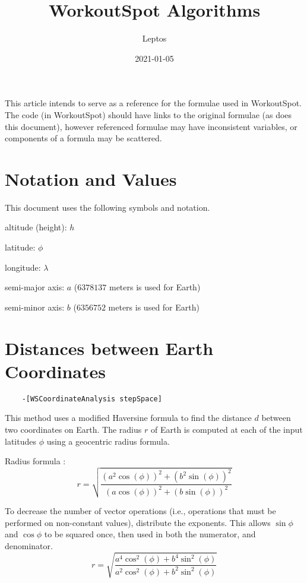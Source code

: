 \documentclass{article}
\title{WorkoutSpot Algorithms}
\author{Leptos}
\date{2021-01-05}
\begin{document}
\maketitle

This article intends to serve as a reference for the formulae used in 
WorkoutSpot. The code (in WorkoutSpot) should have links to the original
formulae (as does this document), however referenced formulae may have 
inconsistent variables, or components of a formula may be scattered.

\section{Notation and Values}

This document uses the following symbols and notation.

altitude (height): $h$

latitude: $\phi$

longitude: $\lambda$

semi-major axis: $a$ ($6378137$ meters is used for Earth)
\cite[Fixed radius]{wikipedia_Earth_radius}

semi-minor axis: $b$ ($6356752$ meters is used for Earth)
\cite[Fixed radius]{wikipedia_Earth_radius}

\pagebreak
\section{Distances between Earth Coordinates}

\begin{verbatim}
    -[WSCoordinateAnalysis stepSpace]  
\end{verbatim}

This method uses a modified Haversine formula to find the
distance $d$ between two coordinates on Earth. The radius $r$ of Earth
is computed at each of the input latitudes $\phi$ using a geocentric
radius formula. 

Radius formula \cite[Geocentric radius]{wikipedia_Earth_radius}:
\begin{equation}
    r = \sqrt{\frac{
        \left(a^2 \cos \left(\phi\right)\right)^2 + 
        \left(b^2 \sin \left(\phi\right)\right)^2
    }{
        \left(a \cos \left(\phi\right)\right)^2 + 
        \left(b \sin \left(\phi\right)\right)^2
    }}
\end{equation}

To decrease the number of vector operations 
(i.e., operations that must be performed on non-constant values),
distribute the exponents. This allows $\sin{\phi}$ and $\cos{\phi}$
to be squared once, then used in both the numerator, and denominator.
\begin{equation}
    r = \sqrt{\frac{
        a^4 \cos^2 \left(\phi \right)+ b^4 \sin^2 \left(\phi\right)
    }{
        a^2 \cos^2 \left(\phi\right) + b^2 \sin^2 \left(\phi\right)
    }}
\end{equation}
\end{document}
